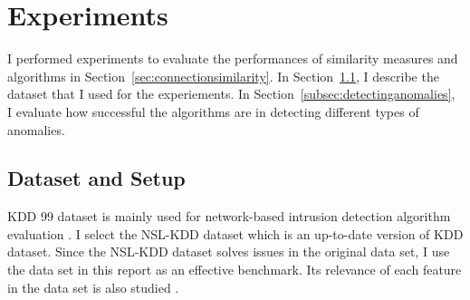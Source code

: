 \section{Experiments}
I performed experiments to evaluate the performances of similarity measures and algorithms in Section~\ref{sec:connectionsimilarity}.
\newline
In Section~\ref{subsec:datasetandsetup}, I describe the dataset that I used for the experiements.\newline
In Section~\ref{subsec:detectinganomalies}, I evaluate how successful the algorithms are in detecting different types of anomalies.

\subsection{Dataset and Setup}
\label{subsec:datasetandsetup}
KDD 99 dataset is mainly used for network-based intrusion detection algorithm evaluation \cite{tavallaee09}. 
I select the NSL-KDD dataset which is an up-to-date version of KDD dataset. 
Since the NSL-KDD dataset solves issues in the original data set, I use the data set in this report as an effective benchmark. 
Its relevance of each feature in the data set is also studied \cite{olusola10} \cite{kayacik05}. 

